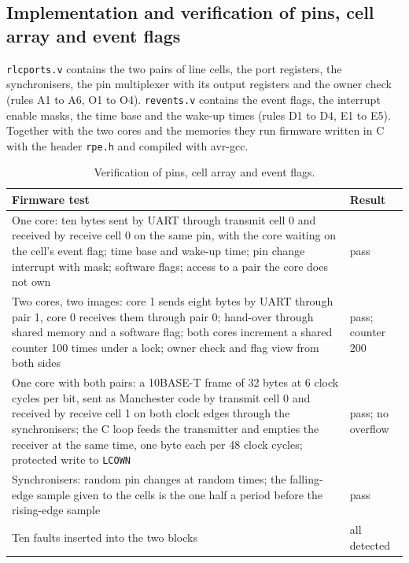 \documentclass[10pt,a4paper]{article}
\newcommand{\reg}[1]{\texttt{#1}}
\begin{document}
\subsection{Implementation and verification of pins, cell array and event flags}\label{sec:perver}

\texttt{rlcports.v} contains the two pairs of line cells, the port registers, the synchronisers, the pin
multiplexer with its output registers and the owner check (rules A1 to A6, O1 to O4). \texttt{revents.v}
contains the event flags, the interrupt enable masks, the time base and the wake-up times (rules D1 to D4, E1
to E5). Together with the two cores and the memories they run firmware written in C with the header
\texttt{rpe.h} and compiled with avr-gcc.

\begin{table}[H]
\centering\small
\begin{tabularx}{\linewidth}{@{}LL@{}}
\toprule
Firmware test & Result \\
\midrule
One core: ten bytes sent by UART through transmit cell 0 and received by receive cell 0 on the same pin, with the core waiting on the cell's event flag; time base and wake-up time; pin change interrupt with mask; software flags; access to a pair the core does not own & pass \\
Two cores, two images: core 1 sends eight bytes by UART through pair 1, core 0 receives them through pair 0; hand-over through shared memory and a software flag; both cores increment a shared counter 100 times under a lock; owner check and flag view from both sides & pass; counter 200 \\
One core with both pairs: a 10BASE-T frame of 32 bytes at 6 clock cycles per bit, sent as Manchester code by transmit cell 0 and received by receive cell 1 on both clock edges through the synchronisers; the C loop feeds the transmitter and empties the receiver at the same time, one byte each per 48 clock cycles; protected write to \reg{LCOWN} & pass; no overflow \\
Synchronisers: random pin changes at random times; the falling-edge sample given to the cells is the one half a period before the rising-edge sample & pass \\
Ten faults inserted into the two blocks & all detected \\
\bottomrule
\end{tabularx}
\caption{Verification of pins, cell array and event flags.}
\end{table}
\end{document}
